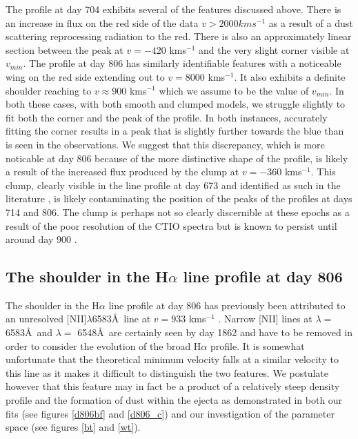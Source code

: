 \documentclass[useAMS,usenatbib,usegraphicx]{mnras}
\begin{document}
The profile at day 704 exhibits several of the features discussed above.  There is an increase in flux on the red side of the data $v>2000kms^{-1}$ as a result of a dust scattering reprocessing radiation to the red.  There is also an approximately linear section between the peak at $v=-420$ kms$^{-1}$ and the very slight corner visible at $v_{min}$.  The profile at day 806 has similarly identifiable features with a noticeable wing on the red side extending out to $v=8000$ kms$^{-1}$.  It also exhibits a definite shoulder reaching to $v \approx 900$ kms$^{-1}$ which we assume to be the value of $v_{min}$.  In both these cases, with both smooth and clumped models, we struggle slightly to fit both the corner and the peak of the profile.  In both instances, accurately fitting the corner  results in a peak that is slightly further towards the blue than is seen in the observations.  We suggest that this discrepancy, which is more noticable at day 806 because of the more distinctive shape of the profile,  is likely a result of the increased flux produced by the clump at  $v=-360$ kms$^{-1}$.  This clump, clearly visible in the line profile at day 673 and identified as such in the literature \citep{Spyromilio1993a,Hanuschik1993}, is likely contaminating the position of the peaks of the profiles at days 714 and 806.  The clump is perhaps not so clearly discernible at these epochs as a result of the poor resolution of the CTIO spectra but is known to persist until around day 900 \citep{Hanuschik1993}.

\subsection{The shoulder in the H$\alpha$ line profile at day 806}

The shoulder in the H$\alpha$ line profile at day 806 has previously been attributed to an unresolved [NII]$\lambda$6583\AA\ line at $v=933$ kms$^{-1}$ \citep{Kozma1998}.  Narrow [NII] lines at $\lambda=$ 6583\AA\ and $\lambda=$ 6548\AA\ are certainly seen by day 1862 and have to be removed in order to consider the evolution of the broad H$\alpha$ profile. It is somewhat unfortunate that the theoretical minimum velocity falls at a similar velocity to this line as it makes it difficult to distinguish the two features.  We postulate however that this feature may in fact be a product of a relatively steep density profile and the formation of dust within the ejecta as demonstrated in both our fits (see figures \ref{d806bf} and \ref{d806_c}) and our investigation of the parameter space (see figures \ref{bt} and \ref{wt}).
\end{document}
